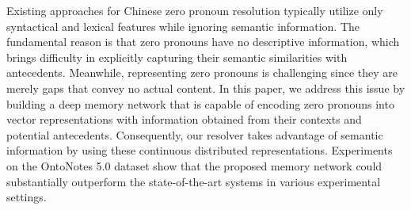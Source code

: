 Existing approaches for Chinese zero pronoun resolution typically utilize only syntactical and lexical features while ignoring semantic information. The fundamental reason is that zero pronouns have no descriptive information, which brings difficulty in explicitly capturing their semantic similarities with antecedents. Meanwhile, representing zero pronouns is challenging since they are merely gaps that convey no actual content. In this paper, we address this issue by building a deep memory network that is capable of encoding zero pronouns into vector representations with information obtained from their contexts and potential antecedents. Consequently, our resolver takes advantage of semantic information by using these continuous distributed representations. Experiments on the OntoNotes 5.0 dataset show that the proposed memory network could substantially outperform the state-of-the-art systems in various experimental settings.
